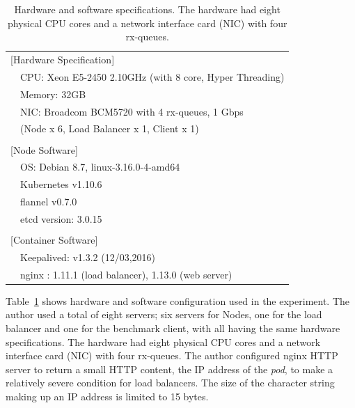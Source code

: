 {
\setlength{\tabcolsep}{2em}
\renewcommand{\arraystretch}{1.1}

\begin{table}[h]
  \centering
  \begin{tabular}{ll}
    \hline 
    \multicolumn{2}{l}{[Hardware Specification]}   \\
    & CPU: Xeon E5-2450 2.10GHz (with 8 core, Hyper Threading) \\
    & Memory: 32GB \\
    & NIC: Broadcom BCM5720 with 4 rx-queues, 1 Gbps \\
    & (Node x 6, Load Balancer x 1, Client x 1) \\
    & \\
    \multicolumn{2}{l}{[Node Software]}  \\
    & OS: Debian 8.7, linux-3.16.0-4-amd64 \\
    & Kubernetes v1.10.6 \\
    & flannel v0.7.0 \\
    & etcd version: 3.0.15 \\
    & \\
    \multicolumn{2}{l}{[Container Software]}   \\
    & Keepalived: v1.3.2 (12/03,2016) \\
    & nginx : 1.11.1 (load balancer), 1.13.0 (web server) \\
    \hline
  \end{tabular}

  \centering
  \begin{minipage}{0.9\columnwidth}
    \caption[Hardware and software specifications]{
      Hardware and software specifications.
      The hardware had eight physical CPU cores and a network interface card (NIC) with four rx-queues.
    }
    \label{tab:hw_machine_spec}
  \end{minipage}
\end{table}
}

Table~\ref{tab:hw_machine_spec} shows hardware and software configuration used in the experiment.
The author used a total of eight servers; six servers for Nodes, one for the load balancer and one for the benchmark client, with all having the same hardware specifications.
The hardware had eight physical CPU cores and a network interface card (NIC) with four rx-queues.
The author configured nginx HTTP server to return a small HTTP content, the IP address of the {\em pod}, to make a relatively severe condition for load balancers. 
The size of the character string making up an IP address is limited to 15 bytes.

